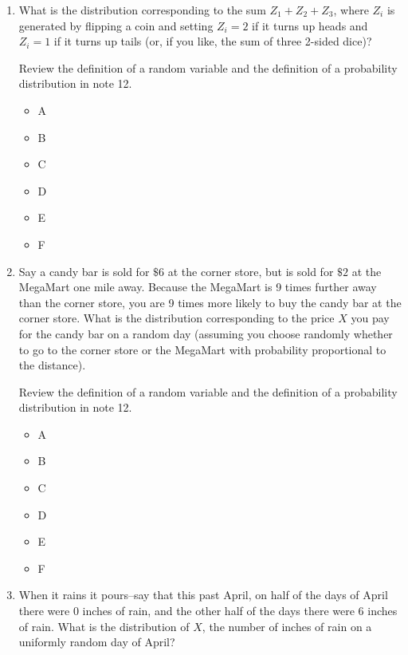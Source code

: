 \documentclass[11pt, preview]{standalone} %
\begin{document}
\begin{enumerate}
\begin{enumerate}
\begin{Multi}
\end{Multi}
\item  What is the distribution corresponding to the sum $Z_1 + Z_2 + Z_3$, where $Z_i$ is generated by flipping a coin and setting $Z_i = 2$ if it turns up heads and $Z_i = 1$ if it turns up tails (or, if you like, the sum of three 2-sided dice)?
\begin{Multi}
Review the definition of a random variable and the definition of a probability distribution in note 12.
\begin{itemize}
\FalseChoice\item A
\FalseChoice\item B
\FalseChoice\item C
\FalseChoice\item D
\FalseChoice\item E
\TrueChoice\item F
\end{itemize}
\end{Multi}
\item Say a candy bar is sold for $\$6$ at the corner store, but is sold for $\$2$ at the MegaMart one mile away. Because the MegaMart is 9 times further away than the corner store, you are 9 times more likely to buy the candy bar at the corner store.  What is the distribution corresponding to the price $X$ you pay for the candy bar on a random day (assuming you choose randomly whether to go to the corner store or the MegaMart with probability proportional to the distance).
\begin{Multi}
Review the definition of a random variable and the definition of a probability distribution in note 12.
\begin{itemize}
\TrueChoice\item A
\FalseChoice\item B
\FalseChoice\item C
\FalseChoice\item D
\FalseChoice\item E
\FalseChoice\item F 
\end{itemize}
\end{Multi}
\item When it rains it pours--say that this past April, on half of the days of April there were 0 inches of rain, and the other half of the days there were 6 inches of rain. What is the distribution of $X$, the number of inches of rain on a uniformly random day of April?  

\end{enumerate}
\end{enumerate}
\end{document}
